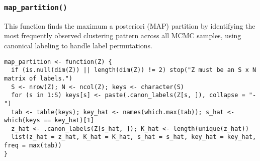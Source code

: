 \documentclass[11pt]{article}
\begin{document}
\subsubsection{\texttt{map\_partition()}}

This function finds the maximum a posteriori (MAP) partition by identifying the most frequently observed clustering pattern across all MCMC samples, using canonical labeling to handle label permutations.

\begin{lstlisting}
map_partition <- function(Z) {
  if (is.null(dim(Z)) || length(dim(Z)) != 2) stop("Z must be an S x N matrix of labels.")
  S <- nrow(Z); N <- ncol(Z); keys <- character(S)
  for (s in 1:S) keys[s] <- paste(.canon_labels(Z[s, ]), collapse = "-")
  tab <- table(keys); key_hat <- names(which.max(tab)); s_hat <- which(keys == key_hat)[1]
  z_hat <- .canon_labels(Z[s_hat, ]); K_hat <- length(unique(z_hat))
  list(z_hat = z_hat, K_hat = K_hat, s_hat = s_hat, key_hat = key_hat, freq = max(tab))
}
\end{lstlisting}
\end{document}
